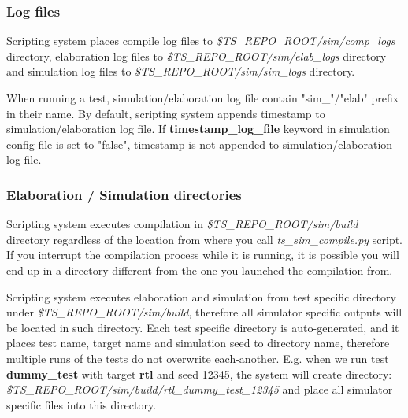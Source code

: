 \documentclass{tropic_design_spec}
\begin{document}
\subsubsection{Log files}
\label{sec:log-files}

Scripting system places compile log files to \textit{\$TS_REPO_ROOT/sim/comp_logs}
directory, elaboration log files to \textit{\$TS_REPO_ROOT/sim/elab_logs} directory
and simulation log files to \textit{\$TS_REPO_ROOT/sim/sim_logs} directory.

When running a test, simulation/elaboration log file contain "sim_"/"elab" prefix in
their name. By default, scripting system appends timestamp to simulation/elaboration
log file. If \textbf{timestamp_log_file} keyword in simulation config file is set to
"false", timestamp is not appended to simulation/elaboration log file.


\subsubsection{Elaboration / Simulation directories}
\label{sec:elaboration-simulation-directories}

Scripting system executes compilation in \textit{\$TS_REPO_ROOT/sim/build} directory
regardless of the location from where you call \textit{ts_sim_compile.py} script. If you
interrupt the compilation process while it is running, it is possible you will end up in
a directory different from the one you launched the compilation from.

Scripting system executes elaboration and simulation from test specific directory under
\textit{\$TS_REPO_ROOT/sim/build}, therefore all simulator specific outputs will be
located in such directory. Each test specific directory is auto-generated, and it
places test name, target name and simulation seed to directory name,
therefore multiple runs of the tests do not overwrite each-another. E.g. when we
run test \textbf{dummy_test} with target \textbf{rtl} and seed 12345, the system will
create directory: \textit{\$TS_REPO_ROOT/sim/build/rtl_dummy_test_12345} and place
all simulator specific files into this directory.
\end{document}
